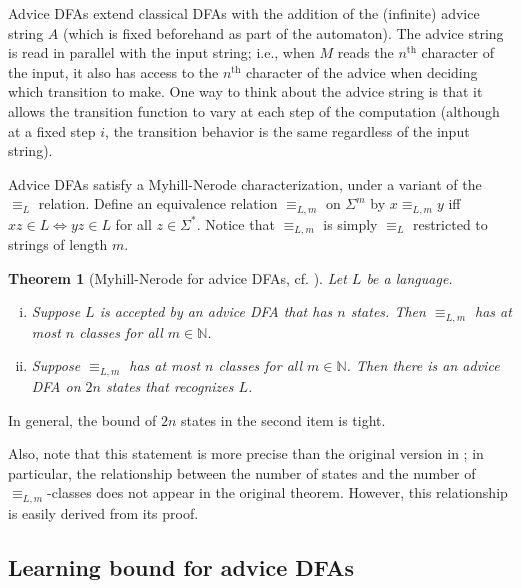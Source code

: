 \documentclass[11pt,a4paper]{amsart}
\newtheorem{theorem}{Theorem}
\theoremstyle{definition}
\newcommand{\bb}{\mathbb}
\newif\ifappendix
\begin{document}
Advice DFAs extend classical DFAs with the addition of the (infinite) advice string $A$ (which is fixed beforehand as part of the automaton). 
The advice string is read in parallel with the input string; i.e., when $M$ reads the $n^\text{th}$ character of the input, it also has access to the $n^\text{th}$ character of the advice when deciding which transition to make.
One way to think about the advice string is that it allows the transition function to vary at each step of the computation (although at a fixed step $i$, the transition behavior is the same regardless of the input string).

Advice DFAs satisfy a Myhill-Nerode characterization, under a variant of the $\equiv_L$ relation.
Define an equivalence relation $\equiv_{L,m}$ on $\Sigma^m$ by $x \equiv_{L,m} y$ iff $xz \in L \iff yz \in L$ for all $z \in \Sigma^*$. Notice that $\equiv_{L,m}$ is simply $\equiv_L$ restricted to strings of length $m$. 

\begin{theorem}[Myhill-Nerode for advice DFAs, cf. {\cite[Theorem 4]{kruckman-etal:myhill-nerode-automata-advice}}] \label{thm:advice myhill-nerode with bounds}
    Let $L$ be a language.
    \begin{enumerate}[(i)]
        \item Suppose $L$ is accepted by an advice DFA that has $n$ states. 
        Then $\equiv_{L,m}$ has at most $n$ classes for all $m \in \bb N$. 
        
        \item Suppose $\equiv_{L,m}$ has at most $n$ classes for all $m \in \bb N$. 
        Then there is an advice DFA on $2n$ states that recognizes $L$.
    \end{enumerate}
\end{theorem}

In general, the bound of $2n$ states in the second item is tight.
\ifappendix A example witnesing this is given in Appendix \ref{appendix:witness to tightness of advice myhill-nerode bounds}. \fi
Also, note that this statement is more precise than the original version in \cite{kruckman-etal:myhill-nerode-automata-advice}; in particular, the relationship between the number of states and the number of $\equiv_{L,m}$-classes does not appear in the original theorem. 
However, this relationship is easily derived from its proof.



\subsection{Learning bound for advice DFAs}
\end{document}
